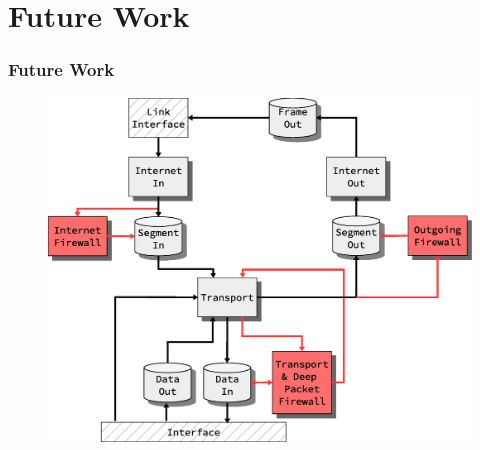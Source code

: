 \section{Future Work}
\begin{frame}
  \frametitle{Future Work}


\begin{figure}
\centering
\includegraphics[scale=0.30]{../thesis/future_work/firewall_integration_design.eps}
\end{figure}

\end{frame}


